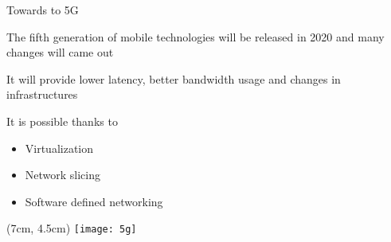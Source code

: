 \begin{frame}{Towards to 5G}

  The fifth generation of mobile technologies will be released in 2020 and many
  changes will came out

  \vfill{}

  It will provide lower latency, better bandwidth usage and changes in
  infrastructures

  \vfill{}

  It is possible thanks to
  \begin{itemize}
    \item Virtualization
    \item Network slicing
    \item Software defined networking
  \end{itemize}


  \begin{textblock*}{1cm}(7cm, 4.5cm)
    \texttt{[image: 5g]}
  \end{textblock*}

\end{frame}